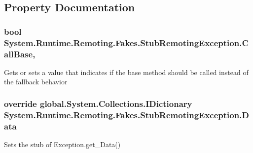 \subsection{Property Documentation}
\hypertarget{class_system_1_1_runtime_1_1_remoting_1_1_fakes_1_1_stub_remoting_exception_a94b52abdefbf4bf375d68982c2645f43}{
\subsubsection[{Call\-Base}]{\setlength{\rightskip}{0pt plus 5cm}bool System.\-Runtime.\-Remoting.\-Fakes.\-Stub\-Remoting\-Exception.\-Call\-Base\hspace{0.3cm}{\ttfamily [get]}, {\ttfamily [set]}}}\label{class_system_1_1_runtime_1_1_remoting_1_1_fakes_1_1_stub_remoting_exception_a94b52abdefbf4bf375d68982c2645f43}


Gets or sets a value that indicates if the base method should be called instead of the fallback behavior

\hypertarget{class_system_1_1_runtime_1_1_remoting_1_1_fakes_1_1_stub_remoting_exception_a90900cc00397e91c3ef2c0c5b3a233e9}{
\subsubsection[{Data}]{\setlength{\rightskip}{0pt plus 5cm}override global.\-System.\-Collections.\-I\-Dictionary System.\-Runtime.\-Remoting.\-Fakes.\-Stub\-Remoting\-Exception.\-Data\hspace{0.3cm}{\ttfamily [get]}}}\label{class_system_1_1_runtime_1_1_remoting_1_1_fakes_1_1_stub_remoting_exception_a90900cc00397e91c3ef2c0c5b3a233e9}


Sets the stub of Exception.\-get\-\_\-\-Data()

